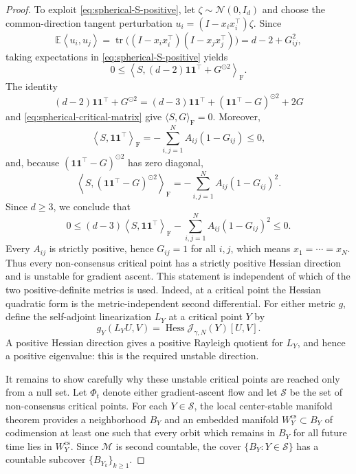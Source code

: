 \documentclass[11pt]{amsart}
\numberwithin{equation}{section}
\theoremstyle{plain}
\newcommand{\E}{\mathbb{E}}
\newcommand{\ip}[2]{\left\langle#1,#2\right\rangle}
\newcommand{\one}{\mathbf{1}}
\begin{document}
\begin{proof}
To exploit \eqref{eq:spherical-S-positive}, let
$\zeta\sim\mathcal N(0,I_d)$ and choose the common-direction tangent
perturbation $u_i=(I-x_ix_i^\top)\zeta$.  Since
\[
 \E\ip{u_i}{u_j}
 =\operatorname{tr}\bigl((I-x_ix_i^\top)(I-x_jx_j^\top)\bigr)
 =d-2+G_{ij}^2,
\]
taking expectations in \eqref{eq:spherical-S-positive} yields
\[
 0\leq\left\langle
 S,(d-2)\one\one^\top+G^{\odot2}\right\rangle_{\mathrm F}.
\]
The identity
\[
 (d-2)\one\one^\top+G^{\odot2}
 =(d-3)\one\one^\top+(\one\one^\top-G)^{\odot2}+2G
\]
and \eqref{eq:spherical-critical-matrix} give
$\langle S,G\rangle_{\mathrm F}=0$.  Moreover,
\[
 \left\langle S,\one\one^\top\right\rangle_{\mathrm F}
 =-\sum_{i,j=1}^N A_{ij}(1-G_{ij})\leq0,
\]
and, because $(\one\one^\top-G)^{\odot2}$ has zero diagonal,
\[
 \left\langle S,(\one\one^\top-G)^{\odot2}\right\rangle_{\mathrm F}
 =-\sum_{i,j=1}^N A_{ij}(1-G_{ij})^2.
\]
Since $d\geq3$, we conclude that
\[
 0\leq(d-3)\left\langle S,\one\one^\top\right\rangle_{\mathrm F}
 -\sum_{i,j=1}^N A_{ij}(1-G_{ij})^2\leq0.
\]
Every $A_{ij}$ is strictly positive, hence $G_{ij}=1$ for all $i,j$, which
means $x_1=\cdots=x_N$.
Thus every non-consensus critical point has a strictly positive Hessian
direction and is unstable for gradient ascent.  This statement is independent
of which of the two positive-definite metrics is used.  Indeed, at a critical
point the Hessian quadratic form is the metric-independent second differential.
For either metric $g$, define the self-adjoint linearization $L_Y$ at a
critical point $Y$ by
\[
 g_Y(L_YU,V)
 =\operatorname{Hess}\mathcal J_{\gamma,N}(Y)[U,V].
\]
A positive Hessian direction gives a positive Rayleigh quotient for $L_Y$,
and hence a positive eigenvalue: this is the required unstable direction.

It remains to show carefully why these unstable critical points are
reached only from a null set.  Let $\Phi_t$ denote either gradient-ascent flow
and let $\mathcal S$ be the set of non-consensus critical points.  For each
$Y\in\mathcal S$, the local center-stable manifold theorem provides a
neighborhood $B_Y$ and an embedded manifold
$W_Y^{\mathrm{cs}}\subset B_Y$ of codimension at least one such that every
orbit which remains in $B_Y$ for all future time lies in
$W_Y^{\mathrm{cs}}$.  Since $\mathcal M$ is second countable, the cover
$\{B_Y:Y\in\mathcal S\}$ has a countable subcover
$\{B_{Y_k}\}_{k\geq1}$.


\end{proof}
\end{document}
